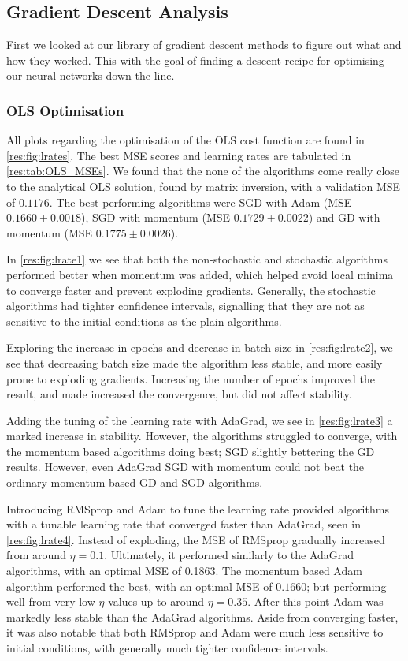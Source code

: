\subsection{Gradient Descent Analysis}
    First we looked at our library of gradient descent methods to figure out what and how they worked. This with the goal of finding a descent recipe for optimising our neural networks down the line.
    
    \subsubsection{OLS Optimisation}
        All plots regarding the optimisation of the OLS cost function are found in \cref{res:fig:lrates}. The best MSE scores and learning rates are tabulated in \cref{res:tab:OLS_MSEs}. We found that the none of the algorithms come really close to the analytical OLS solution, found by matrix inversion, with a validation MSE of $0.1176$. The best performing algorithms were SGD with Adam (MSE $0.1660 \pm 0.0018$), SGD with momentum (MSE $0.1729 \pm 0.0022$) and GD with momentum (MSE $0.1775 \pm 0.0026$).

        In \cref{res:fig:lrate1} we see that both the non-stochastic and stochastic algorithms performed better when momentum was added, which helped avoid local minima to converge faster and prevent exploding gradients. Generally, the stochastic algorithms had tighter confidence intervals, signalling that they are not as sensitive to the initial conditions as the plain algorithms.

        Exploring the increase in epochs and decrease in batch size in \cref{res:fig:lrate2}, we see that decreasing batch size made the algorithm less stable, and more easily prone to exploding gradients. Increasing the number of epochs improved the result, and made increased the convergence, but did not affect stability.

        Adding the tuning of the learning rate with AdaGrad, we see in \cref{res:fig:lrate3} a marked increase in stability. However, the algorithms struggled to converge, with the momentum based algorithms doing best; SGD slightly bettering the GD results. However, even AdaGrad SGD with momentum could not beat the ordinary momentum based GD and SGD algorithms.

        Introducing RMSprop and Adam to tune the learning rate provided algorithms with a tunable learning rate that converged faster than AdaGrad, seen in \cref{res:fig:lrate4}. Instead of exploding, the MSE of RMSprop gradually increased from around $\eta=0.1$. Ultimately, it performed similarly to the AdaGrad algorithms, with an optimal MSE of 0.1863. The momentum based Adam algorithm performed the best, with an optimal MSE of $0.1660$; but performing well from very low $\eta$-values up to around $\eta=0.35$. After this point Adam was markedly less stable than the AdaGrad algorithms. Aside from converging faster, it was also notable that both RMSprop and Adam were much less sensitive to initial conditions, with generally much tighter confidence intervals.

